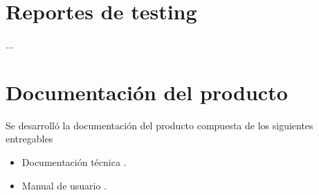 \section{Reportes de testing}

...


\section{Documentación del producto }

Se desarrolló la documentación del producto compuesta de los siguientes entregables
\begin{itemize}
	\item Documentación técnica \cite{Robot_Tecnical_doc}.
	\item Manual de usuario \cite{Robot_User_manual}.
\end{itemize}








